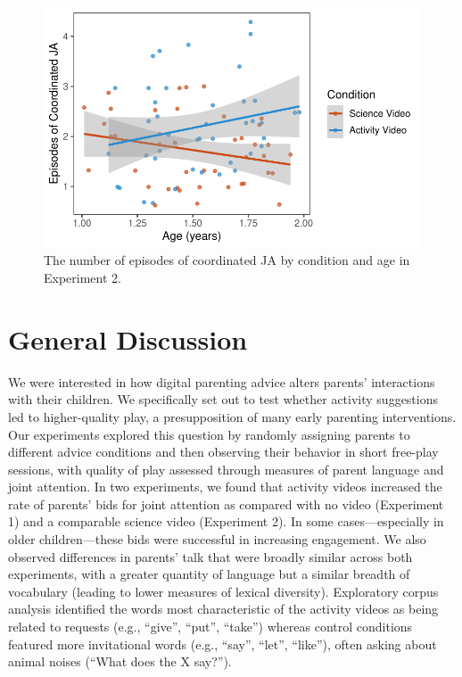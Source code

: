 \documentclass[
  english,
  man]{apa6}
\begin{document}
\begin{figure}[H]

{\centering \includegraphics{figs/e2ja-coord-1} 

}

\caption{The number of episodes of coordinated JA by condition and age in Experiment 2.}\label{fig:e2ja-coord}
\end{figure}

\hypertarget{general-discussion}{%
\section{General Discussion}\label{general-discussion}}

We were interested in how digital parenting advice alters parents' interactions with their children.
We specifically set out to test whether activity suggestions led to higher-quality play, a presupposition of many early parenting interventions.
Our experiments explored this question by randomly assigning parents to different advice conditions and then observing their behavior in short free-play sessions, with quality of play assessed through measures of parent language and joint attention.
In two experiments, we found that activity videos increased the rate of parents' bids for joint attention as compared with no video (Experiment 1) and a comparable science video (Experiment 2).
In some cases---especially in older children---these bids were successful in increasing engagement.
We also observed differences in parents' talk that were broadly similar across both experiments, with a greater quantity of language but a similar breadth of vocabulary (leading to lower measures of lexical diversity).
Exploratory corpus analysis identified the words most characteristic of the activity videos as being related to requests (e.g., \enquote{give}, \enquote{put}, \enquote{take}) whereas control conditions featured more invitational words (e.g., \enquote{say}, \enquote{let}, \enquote{like}), often asking about animal noises (\enquote{What does the X say?}).
\end{document}
